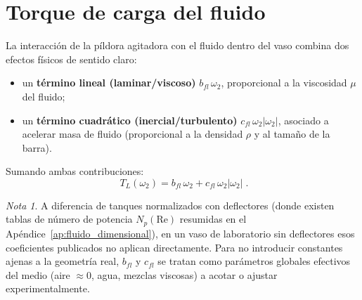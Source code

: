 \documentclass[11pt,a4paper,oneside]{report}
\theoremstyle{definition}
\theoremstyle{remark}
\newtheorem{nota}{Nota}[chapter]
\begin{document}
\section{Torque de carga del fluido}\label{sec:fluido}
La interacción de la píldora agitadora con el fluido dentro del vaso combina
dos efectos físicos de sentido claro:
\begin{itemize}
  \item un \textbf{término lineal (laminar/viscoso)} $b_{fl}\,\omega_2$,
        proporcional a la viscosidad $\mu$ del fluido;
  \item un \textbf{término cuadrático (inercial/turbulento)} $c_{fl}\,\omega_2|\omega_2|$,
        asociado a acelerar masa de fluido (proporcional a la densidad $\rho$ y
        al tamaño de la barra).
\end{itemize}
Sumando ambas contribuciones:
\begin{equation}
  \boxed{\;T_L(\omega_2) = b_{fl}\,\omega_2 + c_{fl}\,\omega_2|\omega_2|\;.}
  \label{eq:carga}
\end{equation}
\begin{nota}
A diferencia de tanques normalizados con deflectores (donde existen tablas de
número de potencia $N_p(\mathrm{Re})$ resumidas en el
Apéndice~\ref{ap:fluido_dimensional}), en un vaso de laboratorio sin deflectores
esos coeficientes publicados no aplican directamente. Para no introducir
constantes ajenas a la geometría real, $b_{fl}$ y $c_{fl}$ se tratan como
parámetros globales efectivos del medio (aire $\approx 0$, agua, mezclas
viscosas) a acotar o ajustar experimentalmente.
\end{nota}
\end{document}
